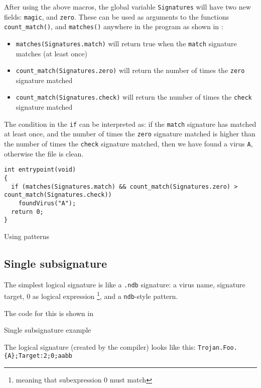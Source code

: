 After using the above macros, the global variable \verb+Signatures+ will have two new fields:
\verb+magic+, and \verb+zero+.
These can be used as arguments to the functions \verb+count_match()+, and \verb+matches()+
anywhere in the program as shown in :
\begin{itemize}
 \item \verb+matches(Signatures.match)+ will return true when the \verb+match+ signature matches (at least once)
 \item \verb+count_match(Signatures.zero)+ will return the number of times the \verb+zero+ signature matched
 \item \verb+count_match(Signatures.check)+ will return the number of times the \verb+check+ signature matched
\end{itemize}

The condition in the \verb+if+ can be interpreted as: if the \verb+match+ signature has matched at least once,
and the number of times the \verb+zero+ signature matched is higher than the number of times the \verb+check+ signature matched,
then we have found a virus \verb+A+, otherwise the file is clean.

\begin{program}
\begin{lstlisting}
int entrypoint(void)
{
  if (matches(Signatures.match) && count_match(Signatures.zero) > count_match(Signatures.check))
    foundVirus("A");
  return 0;
}
\end{lstlisting}
\caption{Using patterns}
\label{prg:counting}
\end{program}

\subsection{Single subsignature}
\label{sec:lsigstut}
The simplest logical signature is like a \verb+.ndb+ signature: a virus name, signature target, 0 as logical expression
\footnote{meaning that subexpression 0 must match}, and a \verb+ndb+-style pattern.

The code for this is shown in 
\begin{program}

\caption{Single subsignature example}
\label{prg:singlesig}
\end{program}

The logical signature (created by the compiler) looks like this:
\verb+Trojan.Foo.{A};Target:2;0;aabb+


